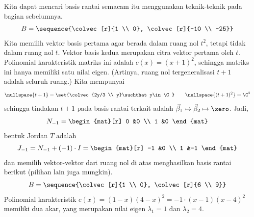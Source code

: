 \begin{exercises}
\begin{answer}
\begin{exparts}
           Kita dapat mencari basis rantai semacam itu menggunakan teknik-teknik pada
           bagian sebelumnya.
           \begin{equation*}
                 B=\sequence{\colvec[r]{1 \\ 0},
                             \colvec[r]{-10 \\ -25}}
           \end{equation*}
           Kita memilih vektor basis pertama agar berada dalam
           ruang nol $t^2$, tetapi tidak dalam ruang nol $t$.
           Vektor basis kedua merupakan citra vektor pertama oleh $t$.
        \partsitem Polinomial karakteristik matriks ini
           adalah \( c(x)=(x+1)^2 \), sehingga matriks ini hanya memiliki satu nilai eigen.
           (Artinya, ruang nol tergeneralisasi $t+1$ adalah seluruh
           ruang.)
           Kita mempunyai
           \begin{equation*}
             \nullspace{t+1}=\set{\colvec{2y/3 \\ y}\suchthat
                                     y\in\C} 
             \qquad
             \nullspace{(t+1)^2}=\C^2 
           \end{equation*}
           sehingga tindakan $t+1$ pada
           basis rantai terkait adalah
           $\vec{\beta}_1\mapsto\vec{\beta}_2\mapsto\zero$.
           Jadi,
           \begin{equation*}
             N_{-1}
             =
             \begin{mat}[r]
                0  &0  \\
                1  &0 
             \end{mat}
           \end{equation*}
           bentuk Jordan $T$ adalah
           \begin{equation*}
             J_{-1}=N_{-1}+(-1)\cdot I
             =
             \begin{mat}[r]
               -1  &0  \\
                1  &-1
             \end{mat}
           \end{equation*}
           dan memilih vektor-vektor dari ruang nol di atas menghasilkan
           basis rantai berikut (pilihan lain juga mungkin).
           \begin{equation*}
             B=\sequence{\colvec[r]{1 \\ 0},
                         \colvec[r]{6 \\ 9}}
           \end{equation*}
        \partsitem Polinomial karakteristik
            \( c(x)=(1-x)(4-x)^2=-1\cdot (x-1)(x-4)^2 \) memiliki dua akar,
            yang merupakan nilai eigen $\lambda_1=1$ dan $\lambda_2=4$.


\end{exparts}
\end{answer}
\end{exercises}
